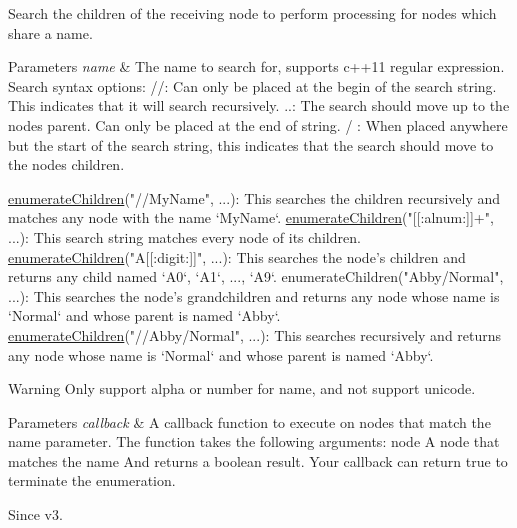 Search the children of the receiving node to perform processing for nodes which share a name.


\begin{DoxyParams}{Parameters}
{\em name} & The name to search for, supports c++11 regular expression. Search syntax options\+: {\ttfamily //}\+: Can only be placed at the begin of the search string. This indicates that it will search recursively. {\ttfamily ..}\+: The search should move up to the node\textquotesingle{}s parent. Can only be placed at the end of string. {\ttfamily /} \+: When placed anywhere but the start of the search string, this indicates that the search should move to the node\textquotesingle{}s children.\\
\hline
\end{DoxyParams}

\begin{DoxyCode}
\hyperlink{classNode_ada6f69bdf4cd0b241dc12935536f3dbe}{enumerateChildren}(\textcolor{stringliteral}{"//MyName"}, ...): This searches the children recursively and matches any
       node with the name `MyName`.
\hyperlink{classNode_ada6f69bdf4cd0b241dc12935536f3dbe}{enumerateChildren}(\textcolor{stringliteral}{"[[:alnum:]]+"}, ...): This search string matches every node of its 
      children.
\hyperlink{classNode_ada6f69bdf4cd0b241dc12935536f3dbe}{enumerateChildren}(\textcolor{stringliteral}{"A[[:digit:]]"}, ...): This searches the node\textcolor{stringliteral}{'s children and returns any
       child named `A0`, `A1`, ..., `A9`.}
\textcolor{stringliteral}{enumerateChildren("Abby/Normal", ...): This searches the node'}s grandchildren and returns any node whose 
      name is `Normal`
and whose parent is named `Abby`.
\hyperlink{classNode_ada6f69bdf4cd0b241dc12935536f3dbe}{enumerateChildren}(\textcolor{stringliteral}{"//Abby/Normal"}, ...): This searches recursively and returns any node 
      whose name is `Normal` and whose
parent is named `Abby`.
\end{DoxyCode}


\begin{DoxyWarning}{Warning}
Only support alpha or number for name, and not support unicode.
\end{DoxyWarning}

\begin{DoxyParams}{Parameters}
{\em callback} & A callback function to execute on nodes that match the {\ttfamily name} parameter. The function takes the following arguments\+: {\ttfamily node} A node that matches the name And returns a boolean result. Your callback can return {\ttfamily true} to terminate the enumeration.\\
\hline
\end{DoxyParams}
\begin{DoxySince}{Since}
v3. 
\end{DoxySince}
\mbox{\label{classNode_ada6f69bdf4cd0b241dc12935536f3dbe}} 
